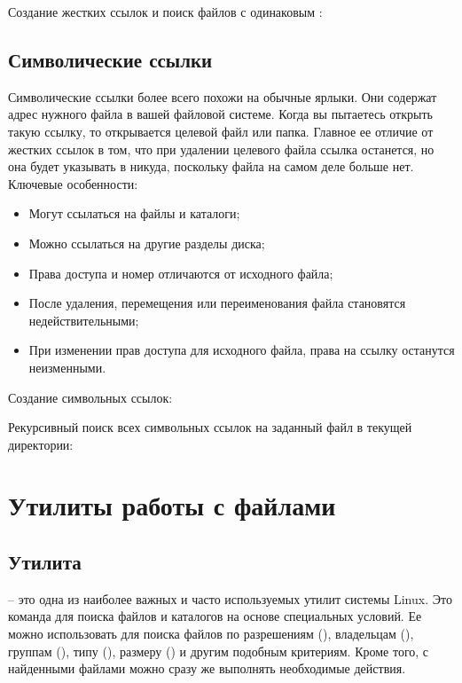 Создание жестких ссылок и поиск файлов с одинаковым :


\subsection{Символические ссылки}

Символические ссылки более всего похожи на обычные ярлыки. Они содержат адрес нужного файла в вашей файловой системе. Когда вы пытаетесь открыть такую ссылку, то открывается целевой файл или папка. Главное ее отличие от жестких ссылок в том, что при удалении целевого файла ссылка останется, но она будет указывать в никуда, поскольку файла на самом деле больше нет. Ключевые особенности:
\begin{itemize}
	\item Могут ссылаться на файлы и каталоги;
	\item Можно ссылаться на другие разделы диска;
	\item Права доступа и номер  отличаются от исходного файла;
	\item После удаления, перемещения или переименования файла становятся недействительными;
	\item При изменении прав доступа для исходного файла, права на ссылку останутся неизменными.
\end{itemize}

Создание символьных ссылок:


Рекурсивный поиск всех символьных ссылок на заданный файл в текущей директории:


\section{Утилиты работы с файлами}

\subsection{Утилита }

 -- это одна из наиболее важных и часто используемых утилит системы Linux. Это команда для поиска файлов и каталогов на основе специальных условий. Ее можно использовать для поиска файлов по разрешениям (), владельцам (), группам (), типу (), размеру () и другим подобным критериям. Кроме того, с найденными файлами можно сразу же выполнять необходимые действия.

